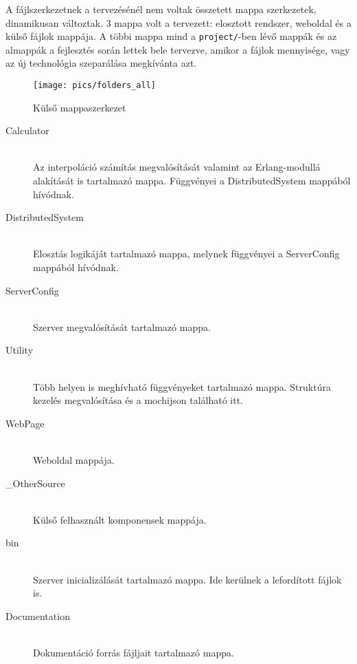 
A fájlszerkezetnek a tervezésénél nem voltak összetett mappa szerkezetek, dinamikusan változtak. 3 mappa volt a tervezett: elosztott rendszer, weboldal és a külső fájlok mappája. A többi mappa mind a \texttt{project/}-ben lévő mappák és az almappák a fejlesztés során lettek bele tervezve, amikor a fájlok mennyisége, vagy az új technológia szeparálása megkívánta azt.

\begin{figure}[h]
	\texttt{[image: pics/folders\_all]}
	\centering
	\caption{Külső mappaszerkezet\label{fig:folders_all}}
\end{figure}

\begin{description}
	\item[Calculator] \hfill \\ 
		Az interpoláció számítás megvalósítását valamint az Erlang-modullá alakítását is tartalmazó mappa.
		Függvényei a DistributedSystem mappából hívódnak.
	\item[DistributedSystem] \hfill \\ 
		Elosztás logikáját tartalmazó mappa, melynek függvényei a ServerConfig mappából hívódnak. 
	\item[ServerConfig] \hfill \\ 
		Szerver megvalósítását tartalmazó mappa.
	\item[Utility] \hfill \\ 
		Több helyen is meghívható függvényeket tartalmazó mappa.
		Struktúra kezelés megvalósítása és a mochijson található itt. 
	\item[WebPage] \hfill \\ 
		Weboldal mappája. 
	\item[\_OtherSource] \hfill \\ 
		Külső felhasznált komponensek mappája.
	\item[bin] \hfill \\ 
		Szerver inicializálását tartalmazó mappa. Ide kerülnek a lefordított fájlok is.
	\item[Documentation] \hfill \\
		Dokumentáció forrás fájljait tartalmazó mappa. 
\end{description}